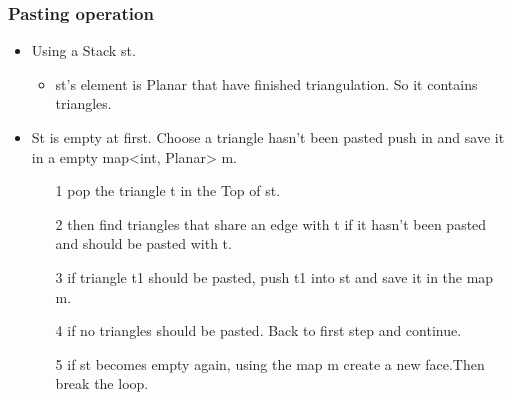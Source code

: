 \documentclass{beamer}
\begin{document}
\begin{frame}
  \frametitle{Pasting operation}
  \begin{itemize}
  \item Using a Stack st.
  \begin{itemize}
  \item st's element is Planar that have finished triangulation. So it contains triangles.
  \end{itemize}
\item St is empty at first. Choose a triangle hasn't been pasted push in and save it in a empty map<int, Planar> m.
  \begin{itemize}
  \item[1] pop the triangle t in the Top of st. 
  \item[2] then find triangles that share an edge with t if it hasn't been pasted and should be pasted with t. 
  \item[3] if triangle t1 should be pasted, push t1 into st and save it in the map m.
  \item[4] if no triangles should be pasted. Back to first step and continue.
  \item[5] if st becomes empty again, using the map m create a new face.Then break the loop.
  \end{itemize}
  
%  

  \end{itemize}
\end{frame}
\end{document}
